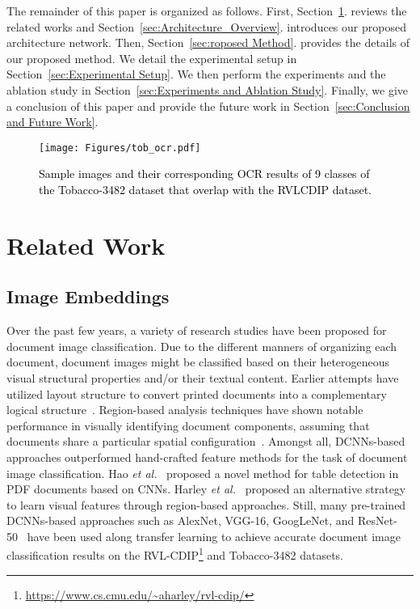 \documentclass[twocolumn]{svjour3}
\newcommand{\etal}{\textit{et al.}}
\begin{document}
The remainder of this paper is organized as follows. First, Section~\ref{sec:Related_Work}. reviews the related works and Section~\ref{sec:Architecture_Overview}. introduces our proposed architecture network. Then, Section~\ref{sec:roposed Method}. provides the details of our proposed method. We detail the experimental setup in Section~\ref{sec:Experimental Setup}. We then perform the experiments and the ablation study in Section~\ref{sec:Experiments and Ablation Study}. Finally, we give a conclusion of this paper and provide the future work in Section~\ref{sec:Conclusion and Future Work}.




\begin{figure*}[ht]
\centering
  \centerline{\texttt{[image: Figures/tob\_ocr.pdf]}}
    \caption{\textcolor{black}{Sample images and their corresponding OCR results of 9 classes of the Tobacco-3482 dataset that overlap with the RVLCDIP dataset.}}
    \label{fig:tob_ocr}
\smallskip
\end{figure*}



\section{Related Work}
\label{sec:Related_Work}

\subsection{Image Embeddings}

Over the past few years, a variety of research studies have been proposed for document image classification. Due to the different manners of organizing each document, document images might be classified based on their heterogeneous visual structural properties and/or their textual content. Earlier attempts have utilized layout structure to convert printed documents into a complementary logical structure~\cite{Dengel1995ClusteringAC}. Region-based analysis techniques have shown notable performance in visually identifying document components, assuming that documents share a particular spatial configuration~\cite{Byun2000FormCU}. Amongst all, DCNNs-based approaches outperformed hand-crafted feature methods for the task of document image classification. Hao \etal~\cite{Hao2016ATD} proposed a novel method for table detection in PDF documents based on CNNs. Harley \etal~\cite{Harley2015EvaluationOD} proposed an alternative strategy to learn visual features through region-based approaches. Still, many pre-trained DCNNs-based approaches such as AlexNet, VGG-16, GoogLeNet, and ResNet-50~\cite{Krizhevsky2017ImageNetCW, Simonyan2015VeryDC, Szegedy2015GoingDW, He2016DeepRL, Afzal2017CuttingTE, tensmeyer2017analysis, Klsch2017RealTimeDI} have been used along transfer learning to achieve accurate document image classification results on the RVL-CDIP\footnote{\url{https://www.cs.cmu.edu/~aharley/rvl-cdip/}} and Tobacco-3482 datasets.
\end{document}
